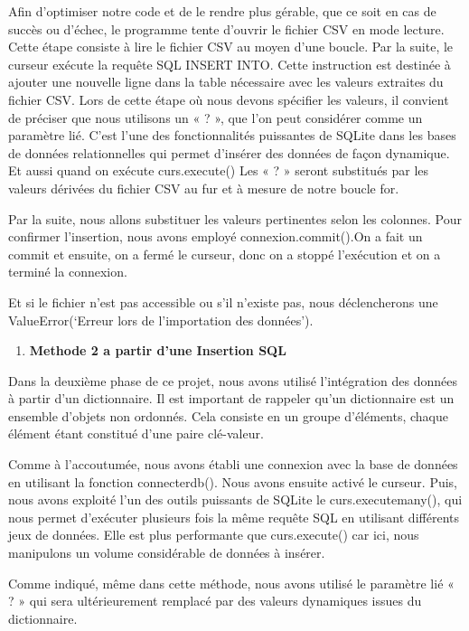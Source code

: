 \documentclass[
]{article}
\providecommand{\tightlist}{%
  \setlength{\itemsep}{0pt}\setlength{\parskip}{0pt}}
\begin{document}
Afin d'optimiser notre code et de le rendre plus gérable, que ce soit en
cas de succès ou d'échec, le programme tente d'ouvrir le fichier CSV en
mode lecture. Cette étape consiste à lire le fichier CSV au moyen d'une
boucle. Par la suite, le curseur exécute la requête SQL INSERT INTO.
Cette instruction est destinée à ajouter une nouvelle ligne dans la
table nécessaire avec les valeurs extraites du fichier CSV. Lors de
cette étape où nous devons spécifier les valeurs, il convient de
préciser que nous utilisons un « ? », que l'on peut considérer comme un
paramètre lié. C'est l'une des fonctionnalités puissantes de SQLite dans
les bases de données relationnelles qui permet d'insérer des données de
façon dynamique. Et aussi quand on exécute curs.execute() Les « ? »
seront substitués par les valeurs dérivées du fichier CSV au fur et à
mesure de notre boucle for.

Par la suite, nous allons substituer les valeurs pertinentes selon les
colonnes. Pour confirmer l'insertion, nous avons employé
connexion.commit().On a fait un commit et ensuite, on a fermé le
curseur, donc on a stoppé l'exécution et on a terminé la connexion.

Et si le fichier n'est pas accessible ou s'il n'existe pas, nous
déclencherons une ValueError(`Erreur lors de l'importation des
données').

\begin{enumerate}
\def\labelenumi{\arabic{enumi}.}
\setcounter{enumi}{1}
\tightlist
\item
  \textbf{Methode 2 a partir d'une Insertion SQL}
\end{enumerate}

Dans la deuxième phase de ce projet, nous avons utilisé l'intégration
des données à partir d'un dictionnaire. Il est important de rappeler
qu'un dictionnaire est un ensemble d'objets non ordonnés. Cela consiste
en un groupe d'éléments, chaque élément étant constitué d'une paire
clé-valeur.

Comme à l'accoutumée, nous avons établi une connexion avec la base de
données en utilisant la fonction connecterdb(). Nous avons ensuite
activé le curseur. Puis, nous avons exploité l'un des outils puissants
de SQLite le curs.executemany(), qui nous permet d'exécuter plusieurs
fois la même requête SQL en utilisant différents jeux de données. Elle
est plus performante que curs.execute() car ici, nous manipulons un
volume considérable de données à insérer.

Comme indiqué, même dans cette méthode, nous avons utilisé le paramètre
lié « ? » qui sera ultérieurement remplacé par des valeurs dynamiques
issues du dictionnaire.
\end{document}
